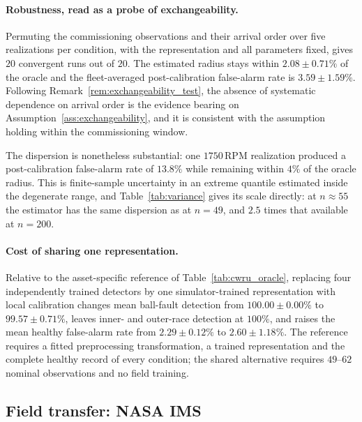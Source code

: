 \documentclass[a4paper]{cas-sc}
\begin{document}
\paragraph{Robustness, read as a probe of exchangeability.}
Permuting the commissioning observations and their arrival order over five
realizations per condition, with the representation and all parameters fixed,
gives \(20\) convergent runs out of \(20\). The estimated radius stays within
\(2.08\pm0.71\%\) of the oracle and the fleet-averaged post-calibration
false-alarm rate is \(3.59\pm1.59\%\). Following
Remark~\ref{rem:exchangeability_test}, the absence of systematic dependence on
arrival order is the evidence bearing on
Assumption~\ref{ass:exchangeability}, and it is consistent with the assumption
holding within the commissioning window.

The dispersion is nonetheless substantial: one \(1750\,\mathrm{RPM}\)
realization produced a post-calibration false-alarm rate of \(13.8\%\) while
remaining within \(4\%\) of the oracle radius. This is finite-sample
uncertainty in an extreme quantile estimated inside the degenerate range, and
Table~\ref{tab:variance} gives its scale directly: at \(n\approx 55\) the
estimator has the same dispersion as at \(n=49\), and \(2.5\) times that
available at \(n=200\).

\paragraph{Cost of sharing one representation.}
Relative to the asset-specific reference of
Table~\ref{tab:cwru_oracle}, replacing four independently trained detectors by
one simulator-trained representation with local calibration changes mean
ball-fault detection from \(100.00\pm0.00\%\) to \(99.57\pm0.71\%\), leaves
inner- and outer-race detection at \(100\%\), and raises the mean healthy
false-alarm rate from \(2.29\pm0.12\%\) to \(2.60\pm1.18\%\). The reference
requires a fitted preprocessing transformation, a trained representation and
the complete healthy record of every condition; the shared alternative
requires \(49\)--\(62\) nominal observations and no field training.

\subsection{Field transfer: NASA IMS}
\label{subsec:results_nasa}
\end{document}
